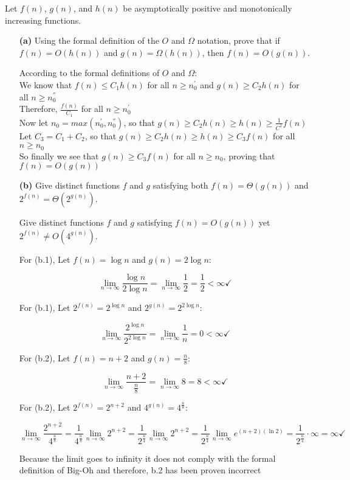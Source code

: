\documentclass[11pt]{article}
\theoremstyle{definition}
\theoremstyle{theorem}
\begin{document}
\noindent Let $f(n)$, $g(n)$, and $h(n)$ be asymptotically positive
and monotonically increasing functions.  
\begin{itemize}
\item[{\bf (a)}] Using the formal definition of the $O$ and $\Omega$
  notation, prove that if $f(n) = O(h(n))$ and $g(n) = \Omega(h(n))$,
  then $f(n) = O(g(n))$.
\begin{flushleft}
According to the formal definitions of $O$ and $\Omega$:\\
We know that $f(n) \leq C_1 h(n)$ for all $n \geq n_0^'$ and $g(n) \geq C_2 h(n)$ for all $n \geq n_0^''$\\
Therefore, $\frac{f(n)}{C_1}$ for all $n \geq n_0^'$\\
Now let $n_0 = max(n_0^',n_0^'')$, so that $g(n) \geq C_2 h(n) \geq h(n) \geq \frac{1}{C^1}f(n)$\\
Let $C_3 = C_1 + C_2$, so that  $g(n) \geq C_2 h(n) \geq h(n) \geq C_3 f(n)$ for all $n \geq n_0$\\
So finally we see that $g(n) \geq C_3 f(n)$ for all $n \geq n_0$, proving that $f(n) = O(g(n))$ \checkmark
\end{flushleft}
\item[{\bf (b)}] Give distinct functions $f$ and $g$ satisfying both
  $f(n) = \Theta(g(n))$ and $2^{f(n)} = \Theta(2^{g(n)})$.

Give distinct functions $f$ and $g$ satisfying $f(n) = O(g(n))$ yet
$2^{f(n)} \neq O(4^{g(n)})$.
  
\begin{flushleft}
For (b.1), Let $f(n) = \log n$ and $g(n) = 2\log n$:
\end{flushleft}
\[ 
\lim_{n\to\infty} \frac{\log n}{2\log n} = \lim_{n\to\infty} \frac{1}{2} = \frac{1}{2} < \infty \checkmark
\]
\begin{flushleft}
For (b.1), Let $2^{f(n)} = 2^{\log n}$ and $2^{g(n)} = 2^{2\log n}$:
\end{flushleft}
\[ 
\lim_{n\to\infty} \frac{2^{\log n}}{2^{2\log n}} = \lim_{n\to\infty} \frac{1}{n} = 0 < \infty \checkmark
\]
\begin{flushleft}
For (b.2), Let $f(n) = n+2$ and $g(n) = \frac{n}{8}$:
\end{flushleft}
\[ 
\lim_{n\to\infty} \frac{n+2}{\frac{n}{8}} = \lim_{n\to\infty} 8 = 8 < \infty \checkmark
\]
\begin{flushleft}
For (b.2), Let $2^{f(n)} = 2^{n+2}$ and $4^{g(n)} = 4^{\frac{n}{8}}$:
\end{flushleft}
\[ 
\lim_{n\to\infty} \frac{2^{n+2}}{4^{\frac{n}{8}}} = \frac{1}{4^{\frac{n}{8}}} \lim_{n\to\infty} 2^{n+2} = \frac{1}{2^{\frac{n}{4}}} \lim_{n\to\infty} 2^{n+2} = 
\frac{1}{2^{\frac{n}{4}}} \lim_{n\to\infty} e^{(n+2)(\ln 2)} = \frac{1}{2^{\frac{n}{4}}} \cdot \infty = \infty \checkmark
\]
\begin{flushleft}
Because the limit goes to infinity it does not comply with the formal definition of Big-Oh and therefore, b.2 has been proven incorrect
\end{flushleft}
\end{itemize}
\end{document}
